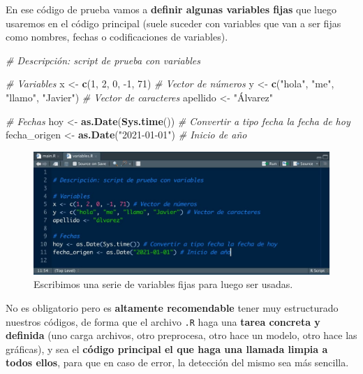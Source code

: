 \documentclass[11pt,]{book}
\newenvironment{Shaded}{\begin{snugshade}}{\end{snugshade}}
\newcommand{\CommentTok}[1]{\textcolor[rgb]{0.37,0.37,0.37}{\textit{#1}}}
\newcommand{\DecValTok}[1]{\textcolor[rgb]{0.06,0.06,0.06}{#1}}
\newcommand{\KeywordTok}[1]{\textcolor[rgb]{0.27,0.27,0.27}{\textbf{#1}}}
\newcommand{\NormalTok}[1]{#1}
\newcommand{\StringTok}[1]{\textcolor[rgb]{0.5,0.5,0.5}{#1}}
\begin{document}
En ese código de prueba vamos a \textbf{definir algunas variables fijas} que luego usaremos en el código principal (suele suceder con variables que van a ser fijas como nombres, fechas o codificaciones de variables).

\begin{Shaded}
\begin{Highlighting}[]
\CommentTok{# Descripción: script de prueba con variables}

\CommentTok{# Variables}
\NormalTok{x <-}\StringTok{ }\KeywordTok{c}\NormalTok{(}\DecValTok{1}\NormalTok{, }\DecValTok{2}\NormalTok{, }\DecValTok{0}\NormalTok{, }\DecValTok{-1}\NormalTok{, }\DecValTok{71}\NormalTok{) }\CommentTok{# Vector de números}
\NormalTok{y <-}\StringTok{ }\KeywordTok{c}\NormalTok{(}\StringTok{"hola"}\NormalTok{, }\StringTok{"me"}\NormalTok{, }\StringTok{"llamo"}\NormalTok{, }\StringTok{"Javier"}\NormalTok{) }\CommentTok{# Vector de caracteres}
\NormalTok{apellido <-}\StringTok{ "Álvarez"}

\CommentTok{# Fechas}
\NormalTok{hoy <-}\StringTok{ }\KeywordTok{as.Date}\NormalTok{(}\KeywordTok{Sys.time}\NormalTok{()) }\CommentTok{# Convertir a tipo fecha la fecha de hoy}
\NormalTok{fecha_origen <-}\StringTok{ }\KeywordTok{as.Date}\NormalTok{(}\StringTok{"2021-01-01"}\NormalTok{) }\CommentTok{# Inicio de año}
\end{Highlighting}
\end{Shaded}

\begin{figure}

{\centering \includegraphics[width=0.5\linewidth]{./img/carpeta_codigos2} 

}

\caption{Escribimos una serie de variables fijas para luego ser usadas.}\label{fig:carpeta-codigos2}
\end{figure}

No es obligatorio pero es \textbf{altamente recomendable} tener muy estructurado nuestros códigos, de forma que el archivo \texttt{.R} haga una \textbf{tarea concreta y definida} (uno carga archivos, otro preprocesa, otro hace un modelo, otro hace las gráficas), y sea el \textbf{código principal el que haga una llamada limpia a todos ellos}, para que en caso de error, la detección del mismo sea más sencilla.
\end{document}
